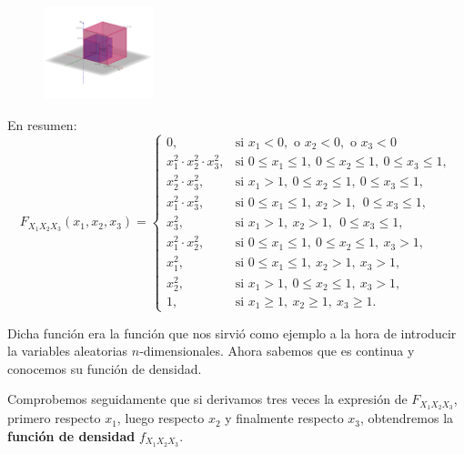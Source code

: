 \documentclass[
  letterpaper,
  DIV=11,
  numbers=noendperiod]{scrreprt}
\begin{document}
\begin{figure}

{\centering \includegraphics[width=1.25in,height=\textheight]{Images/Fx1x2x3pisox1x2.png}

}

\end{figure}

En resumen: \[
F_{X_1X_2X_3}(x_1,x_2,x_3)=\begin{cases}
0, & \mbox{si }x_1<0,\mbox{ o }x_2<0,\mbox{ o }x_3 <0\\
x_1^2\cdot x_2^2\cdot x_3^2, & \mbox{si }0\leq x_1\leq 1,\ 0\leq x_2\leq 1,\ 0\leq x_3\leq 1, \\
 x_2^2\cdot x_3^2, & \mbox{si }x_1> 1,\ 0\leq x_2\leq  1,\ 0\leq x_3\leq  1, \\
 x_1^2\cdot x_3^2, & \mbox{si }0\leq x_1\leq  1,\ x_2> 1,\ \ 0\leq x_3\leq  1, \\
 x_3^2, & \mbox{si }x_1> 1,\ x_2> 1,\ \ 0\leq x_3\leq  1, \\
 x_1^2\cdot x_2^2, & \mbox{si }0\leq x_1\leq  1,\ 0\leq x_2\leq  1,\ x_3> 1,\\
 x_1^2, & \mbox{si }0\leq x_1\leq  1,\ x_2 >  1,\ x_3> 1,\\
 x_2^2, & \mbox{si }x_1>1,\ 0\leq x_2\leq  1,\ x_3> 1,\\
1, & \mbox{si }x_1\geq 1,\ x_2\geq 1,\ x_3\geq 1.
\end{cases}
\]

Dicha función era la función que nos sirvió como ejemplo a la hora de
introducir la variables aleatorias \(n\)-dimensionales. Ahora sabemos
que es continua y conocemos su función de densidad.

Comprobemos seguidamente que si derivamos tres veces la expresión de
\(F_{X_1X_2X_3}\), primero respecto \(x_1\), luego respecto \(x_2\) y
finalmente respecto \(x_3\), obtendremos la \textbf{función de densidad}
\(f_{X_1X_2X_3}\).
\end{document}
